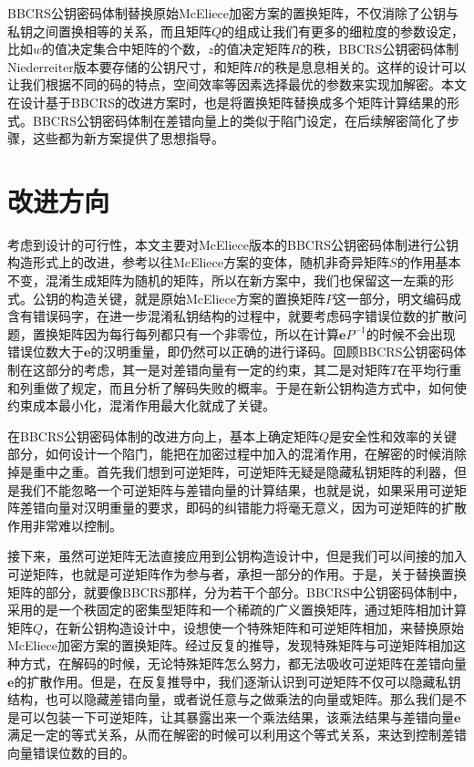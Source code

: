 BBCRS公钥密码体制替换原始McEliece加密方案的置换矩阵，不仅消除了公钥与私钥之间置换相等的关系，而且矩阵$Q$的组成让我们有更多的细粒度的参数设定，比如$w$的值决定集合中矩阵的个数，$z$的值决定矩阵$R$的秩，BBCRS公钥密码体制Niederreiter版本要存储的公钥尺寸，和矩阵$R$的秩是息息相关的。这样的设计可以让我们根据不同的码的特点，空间效率等因素选择最优的参数来实现加解密。本文在设计基于BBCRS的改进方案时，也是将置换矩阵替换成多个矩阵计算结果的形式。BBCRS公钥密码体制在差错向量上的类似于陷门设定，在后续解密简化了步骤，这些都为新方案提供了思想指导。

\section{改进方向}
考虑到设计的可行性，本文主要对McEliece版本的BBCRS公钥密码体制进行公钥构造形式上的改进，参考以往McEliece方案的变体，随机非奇异矩阵$S$的作用基本不变，混淆生成矩阵为随机的矩阵，所以在新方案中，我们也保留这一左乘的形式。公钥的构造关键，就是原始McEliece方案的置换矩阵$P$这一部分，明文编码成含有错误码字，在进一步混淆私钥结构的过程中，就要考虑码字错误位数的扩散问题，置换矩阵因为每行每列都只有一个非零位，所以在计算$\mathbf{e}P^{-1}$的时候不会出现错误位数大于$\mathbf{e}$的汉明重量，即仍然可以正确的进行译码。回顾BBCRS公钥密码体制在这部分的考虑，其一是对差错向量有一定的约束，其二是对矩阵$T$在平均行重和列重做了规定，而且分析了解码失败的概率。于是在新公钥构造方式中，如何使约束成本最小化，混淆作用最大化就成了关键。

在BBCRS公钥密码体制的改进方向上，基本上确定矩阵$Q$是安全性和效率的关键部分，如何设计一个陷门，能把在加密过程中加入的混淆作用，在解密的时候消除掉是重中之重。首先我们想到可逆矩阵，可逆矩阵无疑是隐藏私钥矩阵的利器，但是我们不能忽略一个可逆矩阵与差错向量的计算结果，也就是说，如果采用可逆矩阵差错向量对汉明重量的要求，即码的纠错能力将毫无意义，因为可逆矩阵的扩散作用非常难以控制。

接下来，虽然可逆矩阵无法直接应用到公钥构造设计中，但是我们可以间接的加入可逆矩阵，也就是可逆矩阵作为参与者，承担一部分的作用。于是，关于替换置换矩阵的部分，就要像BBCRS那样，分为若干个部分。BBCRS中公钥密码体制中，采用的是一个秩固定的密集型矩阵和一个稀疏的广义置换矩阵，通过矩阵相加计算矩阵$Q$，在新公钥构造设计中，设想使一个特殊矩阵和可逆矩阵相加，来替换原始McEliece加密方案的置换矩阵。经过反复的推导，发现特殊矩阵与可逆矩阵相加这种方式，在解码的时候，无论特殊矩阵怎么努力，都无法吸收可逆矩阵在差错向量$\mathbf{e}$的扩散作用。但是，在反复推导中，我们逐渐认识到可逆矩阵不仅可以隐藏私钥结构，也可以隐藏差错向量，或者说任意与之做乘法的向量或矩阵。那么我们是不是可以包装一下可逆矩阵，让其暴露出来一个乘法结果，该乘法结果与差错向量$\mathbf{e}$满足一定的等式关系，从而在解密的时候可以利用这个等式关系，来达到控制差错向量错误位数的目的。

